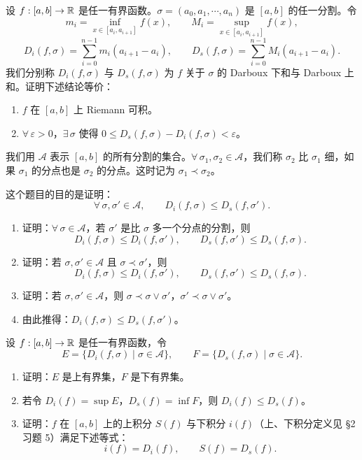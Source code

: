 \begin{exercise}
	\item 设 \(f:[a,b]\to\mathbb{R}\) 是任一有界函数。\(\sigma=(a_0,a_1,\cdots,a_n)\) 是 \([a,b]\) 的任一分割。令
	\[
	m_i=\inf_{x\in[a_i,a_{i+1}]}f(x),\qquad M_i=\sup_{x\in[a_i,a_{i+1}]}f(x),
	\]
	\[
	D_i(f,\sigma)=\sum_{i=0}^{n-1}m_i(a_{i+1}-a_i),\qquad D_s(f,\sigma)=\sum_{i=0}^{n-1}M_i(a_{i+1}-a_i).
	\]
	我们分别称 \(D_i(f,\sigma)\) 与 \(D_s(f,\sigma)\) 为 \(f\) 关于 \(\sigma\) 的 Darboux 下和与 Darboux 上和。证明下述结论等价：
	\begin{enumerate}[label=\arabic*)]
		\item \(f\) 在 \([a,b]\) 上 Riemann 可积。
		\item \(\forall\,\varepsilon>0\)，\(\exists\,\sigma\) 使得 \(0\le D_s(f,\sigma)-D_i(f,\sigma)<\varepsilon\)。
	\end{enumerate}
\end{exercise}

\begin{exercise}
	\item 我们用 \(\mathscr{A}\) 表示 \([a,b]\) 的所有分割的集合。\(\forall\,\sigma_1,\sigma_2\in\mathscr{A}\)，我们称 \(\sigma_2\) 比 \(\sigma_1\) 细，如果 \(\sigma_1\) 的分点也是 \(\sigma_2\) 的分点。这时记为 \(\sigma_1\prec\sigma_2\)。

	这个题目的目的是证明：
	\[
	\forall\,\sigma,\sigma'\in\mathscr{A},\qquad D_i(f,\sigma)\le D_s(f,\sigma').
	\]
	\begin{enumerate}[label=\arabic*)]
		\item 证明：\(\forall\,\sigma\in\mathscr{A}\)，若 \(\sigma'\) 是比 \(\sigma\) 多一个分点的分割，则
		\[
		D_i(f,\sigma)\le D_i(f,\sigma'),\qquad D_s(f,\sigma')\le D_s(f,\sigma).
		\]
		\item 证明：若 \(\sigma,\sigma'\in\mathscr{A}\) 且 \(\sigma\prec\sigma'\)，则
		\[
		D_i(f,\sigma)\le D_i(f,\sigma'),\qquad D_s(f,\sigma')\le D_s(f,\sigma).
		\]
		\item 证明：若 \(\sigma,\sigma'\in\mathscr{A}\)，则 \(\sigma\prec\sigma\vee\sigma'\)，\(\sigma'\prec\sigma\vee\sigma'\)。
		\item 由此推得：\(D_i(f,\sigma)\le D_s(f,\sigma')\)。
	\end{enumerate}
\end{exercise}

\begin{exercise}
	\item 设 \(f:[a,b]\to\mathbb{R}\) 是任一有界函数，令
	\[
	E=\{D_i(f,\sigma)\mid\sigma\in\mathscr{A}\},\qquad F=\{D_s(f,\sigma)\mid\sigma\in\mathscr{A}\}.
	\]
	\begin{enumerate}[label=\arabic*)]
		\item 证明：\(E\) 是上有界集，\(F\) 是下有界集。
		\item 若令 \(D_i(f)=\sup E\)，\(D_s(f)=\inf F\)，则 \(D_i(f)\le D_s(f)\)。
		\item 证明：\(f\) 在 \([a,b]\) 上的上积分 \(S(f)\) 与下积分 \(i(f)\)（上、下积分定义见 §2 习题 5）满足下述等式：
		\[
		i(f)=D_i(f),\qquad S(f)=D_s(f).
		\]
	\end{enumerate}
\end{exercise}

